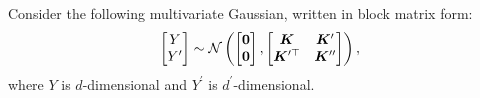 \documentclass[11pt,letterpaper]{article}
\begin{document}
Consider the following multivariate Gaussian, written in block matrix form:
%
\begin{equation*}
  \begin{bmatrix} Y \\ Y^\prime \end{bmatrix}
  \sim
  \mathcal{N} \left(
    \begin{bmatrix}
      {\bm{0}} \\ {\bm{0}}
    \end{bmatrix},
    \begin{bmatrix}
      {\bm{K}} & {\bm{K}}^\prime \\
      {\bm{K}}^{\prime\top} & {\bm{K}}^{\prime\prime}
    \end{bmatrix}
  \right),
\end{equation*}
%
where $Y$ is $d$-dimensional and $Y^\prime$ is $d^\prime$-dimensional.
%
\end{document}
